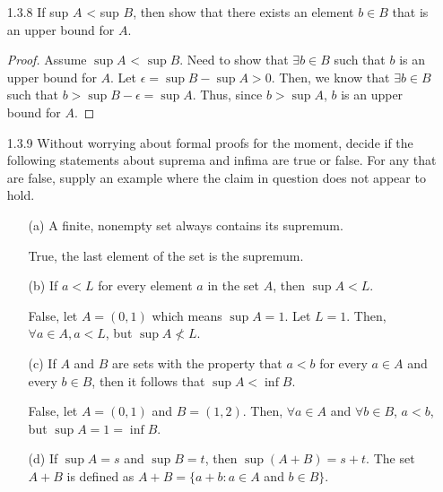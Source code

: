 \documentclass[12pt,letterpaper]{article}
\begin{document}
\begin{itemize}[leftmargin=!,labelindent=5pt]
\begin{itemize}
\begin{proof}
                ($\Leftarrow$) 
                Assume $s$ is a lower bound for $A$ such that $\forall \epsilon > 0$, $s + \epsilon$ is not a lower bound for $A$.
                So, for all lower bounds $l$, $l \leq s$. 
                This satisfies both parts of the definition of $s = \inf A$, that is $s$ is a lower bound and for all lower bounds $l$, $l \leq s$.
            \end{proof}
        \end{itemize}
    \item[1.3.8] If sup $A$ < sup $B$, then show that there exists an element $b \in B$ that is an upper bound for $A$.
    \begin{proof}
        Assume $\sup A$ < $\sup B$. 
        Need to show that $\exists b \in B$ such that $b$ is an upper bound for $A$.
        Let $\epsilon = \sup B - \sup A > 0$.
        Then, we know that $\exists b \in B$ such that $b > \sup B - \epsilon = \sup A$.
        Thus, since $b > \sup A$, $b$ is an upper bound for $A$.
    \end{proof}
    \item[1.3.9] Without worrying about formal proofs for the moment, decide if the following statements about suprema and infima are true or false. For any that are false, supply an example where the claim in question does not appear to hold.
        \begin{itemize}
            \item [(a)] A finite, nonempty set always contains its supremum.
            
                True, the last element of the set is the supremum.
            \item [(b)] If $a < L$ for every element $a$ in the set $A$, then $\sup A < L$.
            
                False, let $A = (0, 1)$ which means $\sup A = 1$. Let $L = 1$. Then, $\forall a \in A, a < L$, but $\sup A \not < L$.
            \item [(c)] If $A$ and $B$ are sets with the property that $a < b$ for every $a \in A$ and every $b \in B$, then it follows that $\sup A < \inf B$.
            
                False, let $A = (0, 1)$ and $B = (1, 2)$. Then, $\forall a \in A$ and $\forall b \in B$, $a < b$, but $\sup A = 1 = \inf B$.
            \item [(d)] If $\sup A = s$ and $\sup B = t$, then $\sup (A+B) = s+t$. The set $A+B$ is defined as $A + B = \{a + b : a \in A$ and $b \in B\}$.
            

\end{itemize}
\end{itemize}
\end{document}
